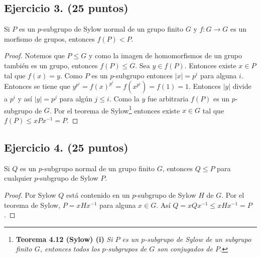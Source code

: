 \documentclass[letterpaper]{article}
\begin{document}
\subsection*{Ejercicio 3. (25 puntos)}
Si $P$ es un $p$-subgrupo de Sylow normal de un grupo finito $G$ y $f : G \to G$ es un morfismo de grupos,
entonces $f(P) < P$.
\begin{proof}
Notemos que $P \leq G$ y como la imagen de homomorfismos de un grupo también es un grupo, entonces $f(P) \leq G$.
Sea $y \in f(P)$. Entonces existe $x \in P$ tal que $f(x) = y$. Como $P$ es un $p$-subgrupo entonces
$|x| = p^i$ para alguna $i$. Entonces se tiene que $y^{p^i} = f(x)^{p^i} = f(x^{p^i}) = f(1) = 1$.
Entonces $|y|$ divide a $p^i$ y así $|y| = p^j$ para algún $j \leq i$. Como la $y$ fue arbitraria $f(P)$
es un $p$-subgrupo de $G$. Por el teorema de Sylow\footnote{
    \textbf{Teorema 4.12 (Sylow) (i)} \emph{Si $P$ es un $p$-subgrupo de Sylow de un subgrupo finito $G$,
    entonces todos los $p$-subgrupos de $G$ son conjugados de $P$.}
} entonces existe $x \in G$ tal que $f(P) \leq xPx^{-1} = P$.
\end{proof}

\subsection*{Ejercicio 4. (25 puntos)}
Si $Q$ es un $p$-subgrupo normal de un grupo finito $G$, entonces $Q \leq P$ para cualquier $p$-subgrupo
de Sylow $P$.
\begin{proof}
Por Sylow $Q$ está contenido en un $p$-subgrupo de Sylow $H$ de $G$. Por el teorema de Sylow, $P = xHx^{-1}$
para alguna $x \in G$. Así $Q = xQx^{-1} \leq xHx^{-1} = P$.
\end{proof}




\end{document}
